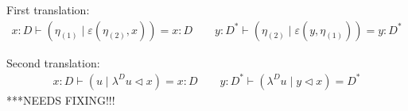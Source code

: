 \documentclass[pra,floatfix,
amsmath,superscriptaddress, 12pt]{article}
\theoremstyle{definition}
\begin{document}
\begin{enumerate}
\begin{itemize}
First translation:
\begin{align*}
	x:D \vdash (\eta_{(1)} \;|\; \varepsilon (\eta_{(2)},x)) = x: D \qquad y:D^* \vdash (\eta_{(2)} \;|\; \varepsilon (y,\eta_{(1)})) = y: D^*
\end{align*}


Second translation:
\begin{align*}
	x:D \vdash (u \;|\;\lambda^D u\triangleleft x) = x: D \qquad y:D^* \vdash (\lambda^D u \;|\; y \triangleleft x) = D^*
\end{align*}
		***NEEDS FIXING!!!
\end{itemize}		

\end{enumerate}
\end{document}
